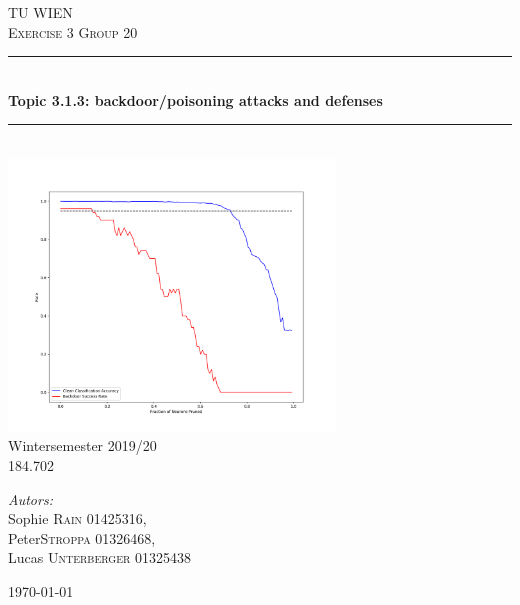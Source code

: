 \documentclass[a4paper,12pt]{report}
\begin{document}
\begin{center}


\textsc{\LARGE TU WIEN}\\[1.5cm]

\textsc{\Large Exercise 3 Group 20}\\[0.4cm]


\thispagestyle{empty}
\newcommand{\HRule}{\rule{\linewidth}{0.5mm}}
\HRule \\[0.4cm]
{ \huge \bfseries Topic 3.1.3: backdoor/poisoning attacks and defenses}\\[0.3cm]

\HRule \\[1.2cm]
\includegraphics[width=0.65\textwidth]{./title}\\[0.5cm]

\Large{Wintersemester 2019/20}\\ [0.8cm]
\Large{184.702} \\ [0.3cm]

\begin{flushleft} \large
\emph{Autors:}\\
Sophie \textsc{Rain} 01425316,\\
Peter\textsc{Stroppa} 01326468,\\
 Lucas \textsc{Unterberger} 01325438 \\[0.5cm]
\end{flushleft}

{\large \today}

\end{center}

\tableofcontents
\thispagestyle{empty}
\newpage
	
\end{document}

